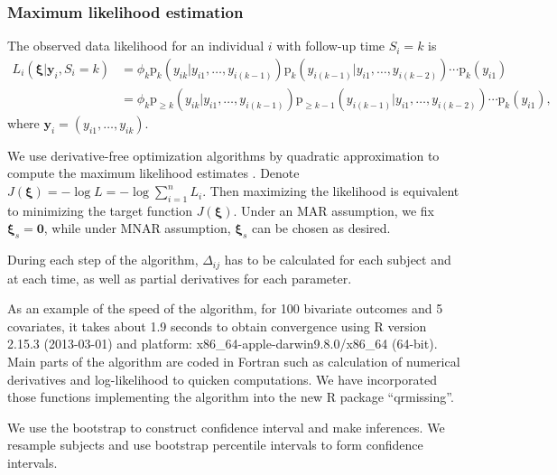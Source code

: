 \documentclass[useAMS,usenatbib,referee]{biom}
\newcommand{\pr}{\mbox{p}}
\begin{document}
\subsubsection{Maximum likelihood estimation}
\label{ch3:sec:mle}

The observed data likelihood for an individual $i$ with follow-up time
$S_i = k$ is
\begin{align} \label{eq:ll} L_i(\bm \xi| \bm y_i, S_{i} = k) & =
  \phi_k\pr_k (y_{ik} | y_{i1}, \ldots, y_{i(k-1)})
  \pr_k (y_{i(k-1)}|y_{i1}, \ldots, y_{i(k-2)}) \cdots \pr_{k} (y_{i1}) \\
  & = \phi_k \pr_{\geq k} (y_{ik} | y_{i1}, \ldots, y_{i(k-1)}) \pr_{\geq k-1}
  (y_{i(k-1)}|y_{i1}, \ldots, y_{i(k-2)}) \cdots \pr_{k} (y_{i1}), \nonumber
\end{align}
where $\bm y_i = (y_{i1}, \ldots, y_{ik})$.

We use derivative-free optimization algorithms by quadratic
approximation to compute the maximum likelihood estimates
\citep{minqa}. Denote $J(\bm \xi) = - \log L = - \log \sum_{i =
  1}^n L_i$.  Then maximizing the likelihood is equivalent to minimizing
the target function $J(\bm \xi)$. Under an MAR assumption, we fix
$\bm \xi_s = \bm 0$, while under MNAR assumption, $\bm \xi_s
$ can be chosen as desired.

During each step of the algorithm, $\Delta_{ij}$ has to be calculated
for each subject and at each time, as well as partial derivatives for
each parameter.

As an example of the speed of the algorithm, for 100 bivariate outcomes and 5 covariates,
it takes about 1.9 seconds to obtain convergence using R version 2.15.3 (2013-03-01) \citep{R} and platform: x86\_64-apple-darwin9.8.0/x86\_64 (64-bit).
Main parts of the algorithm are coded in Fortran such as calculation of numerical derivatives and log-likelihood to quicken computations.
We have incorporated those functions implementing the algorithm into the new R \citep{R} package ``qrmissing''.

We use the bootstrap \citep{efron1993} to
construct confidence interval and make inferences.  We resample
subjects and use bootstrap percentile intervals to form confidence
intervals.

\end{document}
